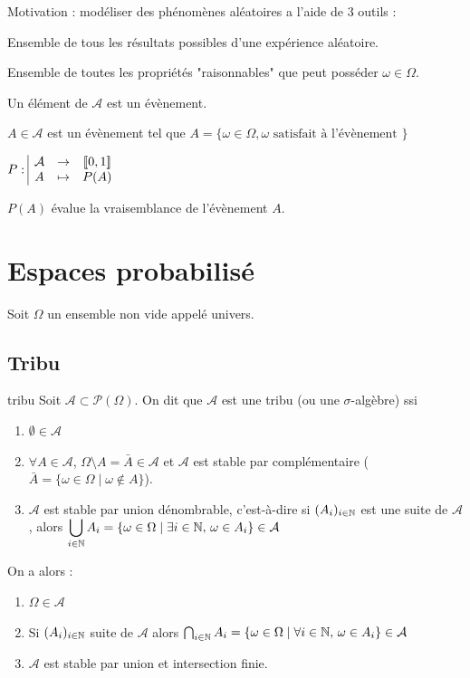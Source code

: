 Motivation : modéliser des phénomènes aléatoires a l'aide de 3 outils : 


Ensemble de tous les résultats possibles d'une expérience aléatoire.


Ensemble de toutes les propriétés "raisonnables" que peut posséder 
$\omega \in \Omega$. 

Un élément de $\mathcal A$ est un évènement. 

$A \in \mathcal A$ est un évènement tel que $A = \{ \omega \in \Omega, \omega \text{ satisfait à l'évènement } \}$



$P: \space \begin{array}{|ccc} \displaystyle \mathcal A & \to & \displaystyle [\![0, 1]\!] \\ \displaystyle A & \mapsto & \displaystyle P(A) \end{array}$

$P(A)$ évalue la vraisemblance de l'évènement $A$. 

\section{Espaces probabilisé}

Soit $\Omega$ un ensemble non vide appelé univers. 

\subsection{Tribu }

\begin{definition}{tribu}{}
    Soit $\mathcal A \subset \mathscr P(\Omega)$. On dit que $\mathcal A$ est une tribu (ou une $\sigma$-algèbre)
    ssi 
    \begin{enumerate}
        \item $\emptyset \in \mathcal A$
        \item $\forall A \in \mathcal A$, $\Omega \setminus A = \bar A \in \mathcal A$ et $\mathcal A$ est stable 
        par complémentaire ($\bar A = \{ \omega \in \Omega \mid \omega \notin A \}$).
        \item $\mathcal A$ est stable par union dénombrable, c'est-à-dire si $(A_i)_{i \in \mathbb{N}}$ est une suite 
        de $\mathcal A$, alors $\displaystyle \bigcup_{i \in \mathbb{N}} A_i = \{\omega \in \Omega \mid \exists i \in \mathbb{N}, \, \omega \in A_i\} \in \mathcal A$ 
    \end{enumerate}
    On a alors : 
    \begin{enumerate}
        \item $\Omega \in \mathcal A$
        \item Si $(A_i)_{i \in \mathbb{N}} $ suite de $\mathcal A$ alors $\bigcap_{i \in \mathbb{N}} A_i = \{\omega \in \Omega \mid \forall i \in \mathbb{N}, \, \omega \in A_i\} \in \mathcal A$
        \item $\mathcal A$ est stable par union et intersection finie. 
    \end{enumerate}
\end{definition}

